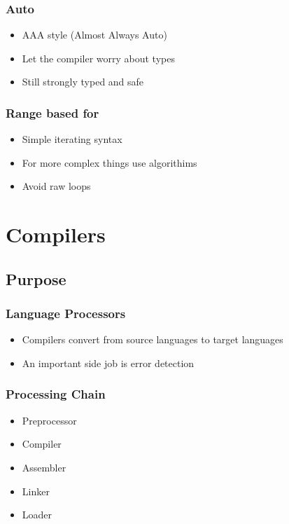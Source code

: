 \documentclass[usepdftitle=false,professionalfonts,compress ]{beamer}
\begin{document}
{
\begin{frame}\frametitle{Auto}

	\begin{itemize}
	\item AAA style (Almost Always Auto)
			\item Let the compiler worry about types
			\item Still strongly typed and safe
				\end{itemize}

\end{frame}}





{
\begin{frame}\frametitle{Range based for}

	\begin{itemize}
	\item Simple iterating syntax
			\item For more complex things use algorithims
			\item Avoid raw loops
				\end{itemize}

\end{frame}}






\section{Compilers}
		
\subsection{Purpose}

{
\begin{frame}\frametitle{Language Processors}

	\begin{itemize}
	\item Compilers convert from source languages to target languages
			\item An important side job is error detection
				\end{itemize}

\end{frame}}




{
\begin{frame}\frametitle{Processing Chain}

	\begin{itemize}
	\item Preprocessor
			\item Compiler
			\item Assembler
			\item Linker
			\item Loader
				\end{itemize}

\end{frame}}
\end{document}
